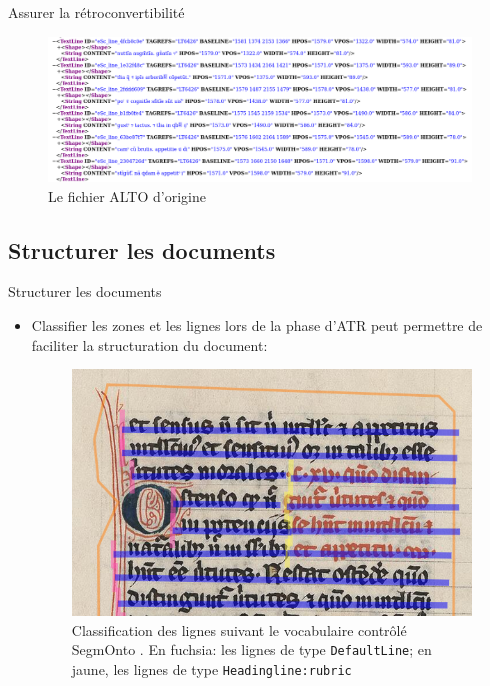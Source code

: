 \documentclass[11pt,aspectratio=169]{beamer}
\let\cite\parencite
\begin{document}
\begin{frame}{Assurer la rétroconvertibilité}
\begin{center}
\begin{figure}
\includegraphics[width=1\textwidth]{img/alto.png}
\caption{Le fichier ALTO d'origine}
\end{figure}
\end{center}
\end{frame}


\subsection{Structurer les documents}
\begin{frame}{Structurer les documents}
\begin{center}
\begin{itemize}
\item Classifier les zones et les lignes lors de la phase d'ATR peut permettre de faciliter la structuration du document:
\begin{figure}
\includegraphics[width=.45\textwidth]{img/segmentation_lignes.png}
\caption{Classification des lignes suivant le vocabulaire contrôlé SegmOnto \cite{gabay_SegmOntoCommonVocabulary_2021}. En fuchsia: les lignes de type \texttt{DefaultLine}; en jaune, les lignes de type \texttt{Headingline:rubric}}
\end{figure}
\end{itemize}
\end{center}
\end{frame}
\end{document}
